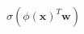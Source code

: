\documentclass[preview]{standalone}
\begin{document}
\begin{align*}
\sigma(\phi(\mathbf{x})^T\mathbf{w})
\end{align*}
\end{document}
